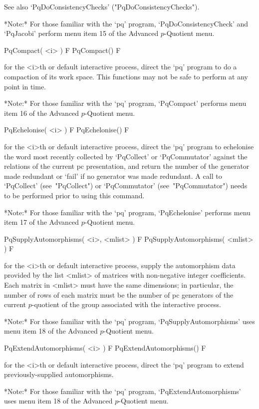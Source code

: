 See also `PqDoConsistencyChecks' ("PqDoConsistencyChecks").

*Note:*
For those familiar  with  the  `pq'  program,  `PqDoConsistencyCheck'  and
`PqJacobi' perform menu item 15 of the Advanced $p$-Quotient menu.

\>PqCompact( <i> ) F
\>PqCompact() F

for the <i>th or default interactive {\ANUPQ} process,  direct  the  `pq'
program to do a compaction of its work space. This functions  may  not  be
safe to perform at any point in time.

*Note:*
For those familiar with the `pq' program, `PqCompact' performs  menu  item
16 of the Advanced $p$-Quotient menu.

\>PqEchelonise( <i> ) F
\>PqEchelonise() F

for the <i>th or default interactive {\ANUPQ} process,  direct  the  `pq'
program to echelonise the word most recently collected by `PqCollect'  or
`PqCommutator' against the relations of the current pc presentation,  and
return the number of  the  generator  made  redundant  or  `fail'  if  no
generator was made redundant. A call to `PqCollect' (see~"PqCollect")  or
`PqCommutator' (see~"PqCommutator") needs to be performed prior to  using
this command.

*Note:*
For those familiar with the `pq'  program,  `PqEchelonise'  performs  menu
item 17 of the Advanced $p$-Quotient menu.

\>PqSupplyAutomorphisms( <i>, <mlist> ) F
\>PqSupplyAutomorphisms( <mlist> ) F

for the  <i>th  or  default  interactive  {\ANUPQ}  process,  supply  the
automorphism  data  provided  by  the  list  <mlist>  of  matrices   with
non-negative integer coefficients. Each matrix in <mlist> must  have  the
same dimensions; in particular, the number of rows of each matrix must be
the number of pc generators of the  current  $p$-quotient  of  the  group
associated with the interactive {\ANUPQ} process.

*Note:* 
For those familiar with the  `pq'  program,  `PqSupplyAutomorphisms'  uses
menu item 18 of the Advanced $p$-Quotient menu.

\>PqExtendAutomorphisms( <i> ) F
\>PqExtendAutomorphisms() F

for the <i>th or default interactive {\ANUPQ} process,  direct  the  `pq'
program to extend previously-supplied automorphisms.

*Note:*
For those familiar with the  `pq'  program,  `PqExtendAutomorphisms'  uses
menu item 18 of the Advanced $p$-Quotient menu.

